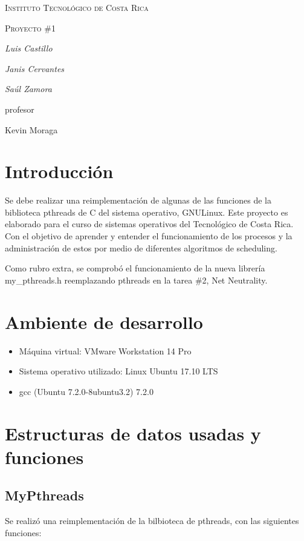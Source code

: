 \documentclass{article}
\begin{document}
\begin{titlepage}
  \centering
  {\scshape\LARGE Instituto Tecnol\'ogico de Costa Rica \par}
  \vspace{1cm}
  {\scshape\Large Proyecto \#1\par}
  \vspace{1.5cm}
  {\Large\itshape Luis Castillo\par}
  {\Large\itshape Janis Cervantes\par}
  {\Large\itshape Sa\'ul Zamora\par}
  \vfill
  profesor\par
  Kevin Moraga \textsc{}

  \vfill

\end{titlepage}

\section{Introducci\'on}
Se debe realizar una re\-implementaci\'on de algunas de las funciones de la biblioteca pthreads de C del sistema operativo, GNU\/Linux. Este proyecto es elaborado para el curso de sistemas operativos del Tecnológico de Costa Rica. Con el objetivo de aprender y entender el funcionamiento de los procesos y la administración de estos por medio de diferentes algoritmos de scheduling. 

Como rubro extra, se comprob\'o el funcionamiento de la nueva librer\'ia my\_pthreads.h reemplazando pthreads en la tarea \#2, Net Neutrality.

\section{Ambiente de desarrollo}
\begin{itemize}
  \item M\'aquina virtual: VMware Workstation 14 Pro
  \item Sistema operativo utilizado: Linux Ubuntu 17.10 LTS
  \item gcc (Ubuntu 7.2.0-8ubuntu3.2) 7.2.0
\end{itemize}

\section{Estructuras de datos usadas y funciones}
\subsection{MyPthreads}
Se realiz\'o una reimplementaci\'on de la bilbioteca de pthreads, con las siguientes funciones:
\end{document}
